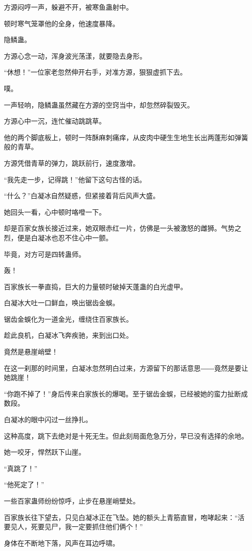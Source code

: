 \begin{this_body}
方源闷哼一声，躲避不开，被寒鱼蛊射中。

顿时寒气笼罩他的全身，他速度暴降。

隐鳞蛊。

方源心念一动，浑身波光荡漾，就要隐去身形。

“休想！”一位家老忽然伸开右手，对准方源，狠狠虚抓下去。

噗。

一声轻响，隐鳞蛊虽然藏在方源的空窍当中，却忽然碎裂毁灭。

方源心中一沉，连忙催动跳跳草。

他的两个脚底板上，顿时一阵酥麻刺痛痒，从皮肉中硬生生地生长出两蓬形如弹簧般的青草。

方源凭借青草的弹力，跳跃前行，速度激增。

“我先走一步，记得跳！”他留下这句古怪的话。

“什么？”白凝冰自然疑惑，但紧接着背后风声大盛。

她回头一看，心中顿时咯噔一下。

却是百家女族长接近过来，她双眼赤红一片，仿佛是一头被激怒的雌狮。气势之烈，便是白凝冰也忍不住心中一颤。

毕竟，对方可是四转蛊师。

轰！

百家族长一拳直捣，巨大的力量顿时破掉天蓬蛊的白光虚甲。

白凝冰大吐一口鲜血，唤出锯齿金蜈。

锯齿金蜈化为一道金光，缠绕住百家族长。

趁此良机，白凝冰飞奔疾驰，来到出口处。

竟然是悬崖峭壁！

在这一刹那的时间里，白凝冰忽然明白过来，方源留下的那话意思――竟然是要让她跳崖！

“你跑不掉了！”身后传来白家族长的爆喝。至于锯齿金蜈，已经被她的蛮力扯断成数段。

白凝冰的眼中闪过一丝挣扎。

这种高度，跳下去绝对是十死无生。但此刻局面危急万分，早已没有选择的余地。

她一咬牙，悍然跃下山崖。

“真跳了！”

“他死定了！”

一些百家蛊师纷纷惊呼，止步在悬崖峭壁处。

百家族长往下望去，只见白凝冰正在飞坠。她的额头上青筋直冒，咆哮起来：“活要见人，死要见尸，我一定要抓住他们俩个！”

身体在不断地下落，风声在耳边呼啸。


\end{this_body}
